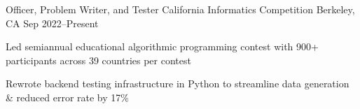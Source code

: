 \experience
{Officer, Problem Writer, and Tester}
{California Informatics Competition}
{Berkeley, CA}
{Sep 2022--Present}
{
	\item Led semiannual educational algorithmic programming contest with 900+ participants across 39 countries per contest
	\item Rewrote backend testing infrastructure in Python to streamline data generation \& reduced error rate by 17\%
}
